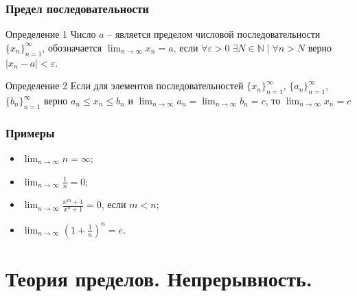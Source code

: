 \documentclass[10pt]{beamer}
\numberwithin{equation}{subsection}
\begin{document}
    \begin{frame}[fragile]
        \frametitle{Предел последовательности}
        \begin{block}{Определение 1}
            \small
            Число $a$ -- является пределом числовой последовательности $\{x_n\}_{n=1}^\infty$, обозначается $\displaystyle\lim_{n \rightarrow \infty} x_n = a$, 
            если $\forall \varepsilon > 0 \; \exists N \in \mathbb{N}\;|\;\forall n > N$ верно $\left| x_n - a \right| < \varepsilon $.
        \end{block} 
        \begin{block}{Определение 2}
            \small
            Если для элементов последовательностей $\{x_n\}_{n=1}^\infty$, $\{a_n\}_{n=1}^\infty$, $\{b_n\}_{n=1}^\infty$ верно $a_n \leq x_n \leq b_n$ и 
            $\displaystyle\lim_{n \rightarrow \infty} a_n = \lim_{n \rightarrow \infty} b_n = c$, то $\lim_{n \rightarrow \infty} x_n =c$
        \end{block} 
    \end{frame}

    \begin{frame}
        \frametitle{Примеры}
        \begin{itemize}
            \item $\displaystyle\lim_{n \rightarrow \infty} n = \infty $;
            \item $\displaystyle\lim_{n \rightarrow \infty} \frac{1}{n} = 0$;
            \item $\displaystyle\lim_{n \rightarrow \infty} \frac{x^m+1}{x^n+1} = 0 $, если $m<n$;
            \item $\displaystyle\lim_{n \rightarrow \infty} \left(1+\frac{1}{n}\right)^n = e $.
        \end{itemize}
    \end{frame}

    \section{Теория пределов. Непрерывность.}
\end{document}
